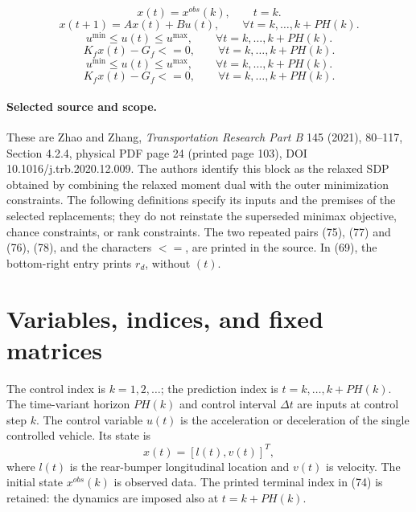 \documentclass[10pt]{article}
\begin{document}
\begin{equation}
x(t)=x^{obs}(k),\qquad t=k.
\tag{73}
\end{equation}
\begin{equation}
x(t+1)=Ax(t)+Bu(t),\qquad\forall t=k,\ldots,k+PH(k).
\tag{74}
\end{equation}
\begin{equation}
u^{\min}\leq u(t)\leq u^{\max},\qquad\forall t=k,\ldots,k+PH(k).
\tag{75}
\end{equation}
\begin{equation}
K_fx(t)-G_f\mathrel{<=}0,\qquad\forall t=k,\ldots,k+PH(k).
\tag{76}
\end{equation}
\begin{equation}
u^{\min}\leq u(t)\leq u^{\max},\qquad\forall t=k,\ldots,k+PH(k).
\tag{77}
\end{equation}
\begin{equation}
K_fx(t)-G_f\mathrel{<=}0,\qquad\forall t=k,\ldots,k+PH(k).
\tag{78}
\end{equation}

\paragraph{Selected source and scope.}
These are Zhao and Zhang, \emph{Transportation Research Part B} 145 (2021), 80--117, Section 4.2.4, physical PDF page 24 (printed page 103), DOI 10.1016/j.trb.2020.12.009. The authors identify this block as the relaxed SDP obtained by combining the relaxed moment dual with the outer minimization constraints. The following definitions specify its inputs and the premises of the selected replacements; they do not reinstate the superseded minimax objective, chance constraints, or rank constraints. The two repeated pairs (75), (77) and (76), (78), and the characters \(<=\), are printed in the source. In (69), the bottom-right entry prints \(r_d\), without \((t)\).

\section*{Variables, indices, and fixed matrices}
The control index is \(k=1,2,\ldots\); the prediction index is \(t=k,\ldots,k+PH(k)\). The time-variant horizon \(PH(k)\) and control interval \(\Delta t\) are inputs at control step \(k\). The control variable \(u(t)\) is the acceleration or deceleration of the single controlled vehicle. Its state is
\[
x(t)=[l(t),v(t)]^T,
\]
where \(l(t)\) is the rear-bumper longitudinal location and \(v(t)\) is velocity. The initial state \(x^{obs}(k)\) is observed data. The printed terminal index in (74) is retained: the dynamics are imposed also at \(t=k+PH(k)\).
\end{document}
